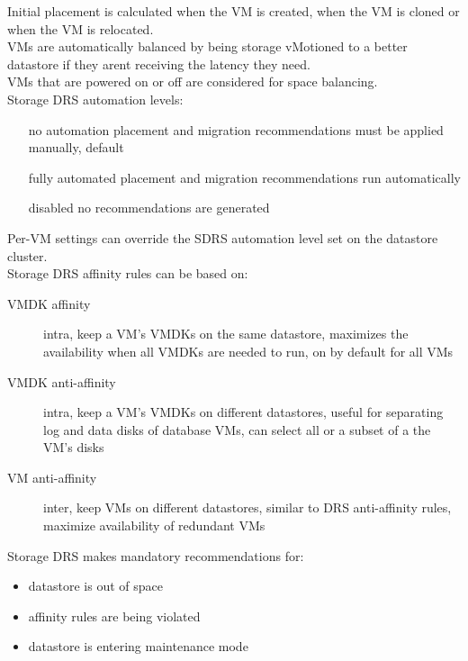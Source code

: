 Initial placement is calculated when the VM is created, when the VM is cloned
or when the VM is relocated.\\

VMs are automatically balanced by being storage vMotioned to a better
datastore if they arent receiving the latency they need.\\

VMs that are powered on or off are considered for space balancing.\\

Storage DRS automation levels:

\begin{itemize}

\item[no automation]
placement and migration recommendations must be applied manually, default

\item[fully automated]
placement and migration recommendations run automatically

\item[disabled]
no recommendations are generated

\end{itemize}

Per-VM settings can override the SDRS automation level set on the datastore
cluster.\\

Storage DRS affinity rules can be based on:

\begin{description}

\item[VMDK affinity]
intra, keep a VM's VMDKs on the same datastore, maximizes the availability
when all VMDKs are needed to run, on by default for all VMs

\item[VMDK anti-affinity]
intra, keep a VM's VMDKs on different datastores, useful for separating log and
data disks of database VMs, can select all or a subset of a the VM's disks

\item[VM anti-affinity]
inter, keep VMs on different datastores, similar to DRS anti-affinity rules,
maximize availability of redundant VMs

\end{description}

Storage DRS makes mandatory recommendations for:

\begin{itemize}
\item datastore is out of space
\item affinity rules are being violated
\item datastore is entering maintenance mode
\end{itemize}


